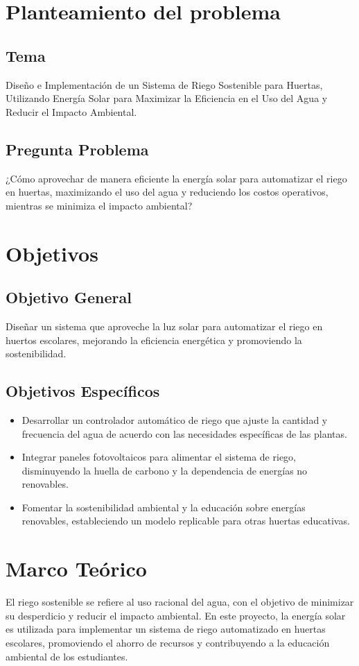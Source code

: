 \documentclass[12pt]{article}
\begin{document}
\section{Planteamiento del problema}
\subsection{Tema}
Diseño e Implementación de un Sistema de Riego Sostenible para Huertas, Utilizando Energía Solar para Maximizar la Eficiencia en el Uso del Agua y Reducir el Impacto Ambiental.

\subsection{Pregunta Problema}
¿Cómo aprovechar de manera eficiente la energía solar para automatizar el riego en huertas, maximizando el uso del agua y reduciendo los costos operativos, mientras se minimiza el impacto ambiental?
\newpage
\section{Objetivos}
\subsection{Objetivo General}
Diseñar un sistema que aproveche la luz solar para automatizar el riego en huertos escolares, mejorando la eficiencia energética y promoviendo la sostenibilidad.


\subsection{Objetivos Específicos}
\begin{itemize}
      \item Desarrollar un controlador automático de riego que ajuste la cantidad y frecuencia del agua de acuerdo con las necesidades específicas de las plantas.
      \item Integrar paneles fotovoltaicos para alimentar el sistema de riego, disminuyendo la huella de carbono y la dependencia de energías no renovables.
      \item Fomentar la sostenibilidad ambiental y la educación sobre energías renovables, estableciendo un modelo replicable para otras huertas educativas.
\end{itemize}
\newpage
\section{Marco Teórico}
El riego sostenible se refiere al uso racional del agua, con el objetivo de minimizar su desperdicio y reducir el impacto ambiental. En este proyecto, la energía solar es utilizada para implementar un sistema de riego automatizado en huertas escolares, promoviendo el ahorro de recursos y contribuyendo a la educación ambiental de los estudiantes.
\end{document}
